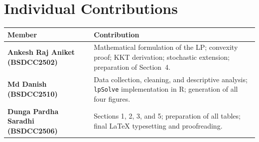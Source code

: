 \documentclass[12pt,a4paper]{article}
\begin{document}
\section*{Individual Contributions}

\begin{table}[H]
\centering
\begin{tabular}{>{\bfseries}p{5cm}p{8.5cm}}
\toprule
\textbf{Member} & \textbf{Contribution} \\
\midrule
Ankesh Raj Aniket (BSDCC2502)
  & Mathematical formulation of the LP; convexity proof; KKT derivation;
    stochastic extension; preparation of Section~4. \\[6pt]
Md Danish (BSDCC2510)
  & Data collection, cleaning, and descriptive analysis;
    \texttt{lpSolve} implementation in R; generation of all four figures. \\[6pt]
Dunga Pardha Saradhi (BSDCC2506)
  & Sections 1, 2, 3, and 5; preparation of all tables;
    final \LaTeX{} typesetting and proofreading. \\
\bottomrule
\end{tabular}
\end{table}
\end{document}
